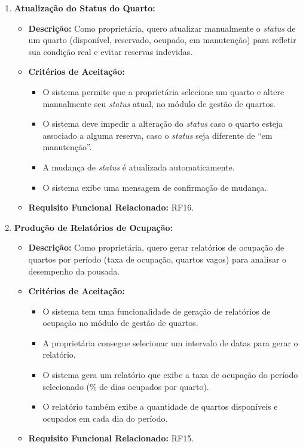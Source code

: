 \documentclass[
	12pt,				%
	openany,			%
	oneside,			%
	a4paper,			%
	english,			%
	french,				%
	spanish,			%
	brazil				%
	]{abntex2}
\begin{document}
\begin{enumerate}[label=\textbf{\arabic*.}]
	\item \textbf{Atualização do Status do Quarto:}
	\begin{itemize}
		\item \textbf{Descrição:} Como proprietária, quero atualizar manualmente o  \textit{status} de um quarto (disponível, reservado, ocupado, em manutenção) para refletir sua condição real e evitar reservas indevidas.
		\item \textbf{Critérios de Aceitação:}
		\begin{itemize}
			\item O sistema permite que a proprietária selecione um quarto e altere manualmente seu  \textit{status} atual, no módulo de gestão de quartos.
			\item O sistema deve impedir a alteração do  \textit{status} caso o quarto esteja associado a alguma reserva, caso o  \textit{status} seja diferente de “em manutenção”.
			\item A mudança de \textit{status} é atualizada automaticamente.
			\item O sistema exibe uma mensagem de confirmação de mudança.
		\end{itemize}
		\item \textbf{Requisito Funcional Relacionado:} RF16.
	\end{itemize} 
	\item \textbf{Produção de Relatórios de Ocupação:}
	\begin{itemize}
		\item \textbf{Descrição:} Como proprietária, quero gerar relatórios de ocupação de quartos por período (taxa de ocupação, quartos vagos) para analisar o desempenho da pousada.
		\item \textbf{Critérios de Aceitação:}
		\begin{itemize}
			\item O sistema tem uma funcionalidade de geração de relatórios de ocupação no módulo de gestão de quartos.
			\item A proprietária consegue selecionar um intervalo de datas para gerar o relatório.
			\item O sistema gera um relatório que exibe a taxa de ocupação do período selecionado (\% de dias ocupados por quarto).
			\item O relatório também exibe a quantidade de quartos disponíveis e ocupados em cada dia do período.
		\end{itemize}
		\item \textbf{Requisito Funcional Relacionado:} RF15.

\end{itemize}
\end{enumerate}
\end{document}
